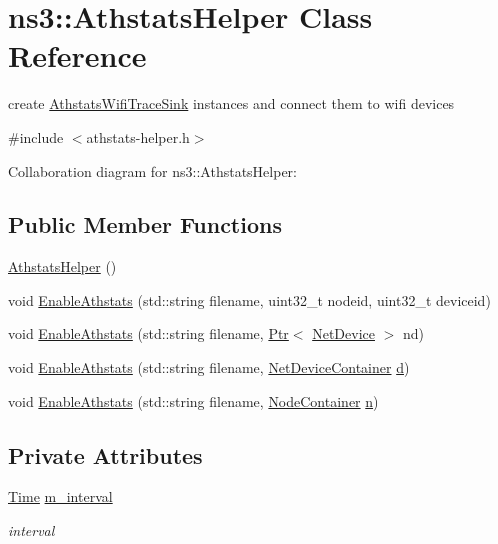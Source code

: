 \hypertarget{classns3_1_1AthstatsHelper}{}\section{ns3\+:\+:Athstats\+Helper Class Reference}
\label{classns3_1_1AthstatsHelper}


create \hyperlink{classns3_1_1AthstatsWifiTraceSink}{Athstats\+Wifi\+Trace\+Sink} instances and connect them to wifi devices  




{\ttfamily \#include $<$athstats-\/helper.\+h$>$}



Collaboration diagram for ns3\+:\+:Athstats\+Helper\+:
\subsection*{Public Member Functions}
\begin{DoxyCompactItemize}
\item 
\hyperlink{classns3_1_1AthstatsHelper_abef67899f9ce2876203aac1d26751ecd}{Athstats\+Helper} ()
\item 
void \hyperlink{classns3_1_1AthstatsHelper_aa8fa3e8309af2f6a7293b3b1364a6f8f}{Enable\+Athstats} (std\+::string filename, uint32\+\_\+t nodeid, uint32\+\_\+t deviceid)
\item 
void \hyperlink{classns3_1_1AthstatsHelper_ad63d08e27368c0fa600cb94058d48711}{Enable\+Athstats} (std\+::string filename, \hyperlink{classns3_1_1Ptr}{Ptr}$<$ \hyperlink{classns3_1_1NetDevice}{Net\+Device} $>$ nd)
\item 
void \hyperlink{classns3_1_1AthstatsHelper_a052457ded163dc7915ba0d86f0eefca5}{Enable\+Athstats} (std\+::string filename, \hyperlink{classns3_1_1NetDeviceContainer}{Net\+Device\+Container} \hyperlink{lte__pathloss_8m_a1aabac6d068eef6a7bad3fdf50a05cc8}{d})
\item 
void \hyperlink{classns3_1_1AthstatsHelper_af3fdf2d2932b02ee3eac3f6d39d38e58}{Enable\+Athstats} (std\+::string filename, \hyperlink{classns3_1_1NodeContainer}{Node\+Container} \hyperlink{lte__link__budget__x2__handover__measures_8m_abdb05bc5a064cf642a06c83b3392f148}{n})
\end{DoxyCompactItemize}
\subsection*{Private Attributes}
\begin{DoxyCompactItemize}
\item 
\hyperlink{classns3_1_1Time}{Time} \hyperlink{classns3_1_1AthstatsHelper_a78faf29aed06227a57023267aa98d16b}{m\+\_\+interval}
\begin{DoxyCompactList}\small\item\em interval \end{DoxyCompactList}\end{DoxyCompactItemize}


